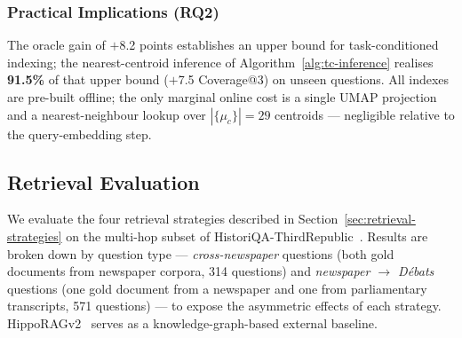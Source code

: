 
\subsubsection{Practical Implications (\textbf{RQ2})}
\label{sec:indexing-practical}

The oracle gain of $+$8.2 points establishes an upper bound for task-conditioned
indexing; the nearest-centroid inference of Algorithm~\ref{alg:tc-inference}
realises \textbf{91.5\%} of that upper bound ($+$7.5 Coverage@3) on unseen
questions.
All indexes are pre-built offline; the only marginal online cost is a single
UMAP projection and a nearest-neighbour lookup over $|\{\mu_c\}| = 29$ centroids
— negligible relative to the query-embedding step.


\subsection{Retrieval Evaluation}
\label{sec:retrieval-results}



We evaluate the four retrieval strategies described in
Section~\ref{sec:retrieval-strategies} on the multi-hop subset of
HistoriQA-ThirdRepublic~\cite{historiqa}.
Results are broken down by question type — \textit{cross-newspaper} questions (both
gold documents from newspaper corpora, 314 questions) and
\textit{newspaper $\rightarrow$ Débats} questions (one gold document from a newspaper
and one from parliamentary transcripts, 571 questions) — to expose the asymmetric
effects of each strategy.
HippoRAGv2~\cite{hipporagv2} serves as a knowledge-graph-based external baseline.


